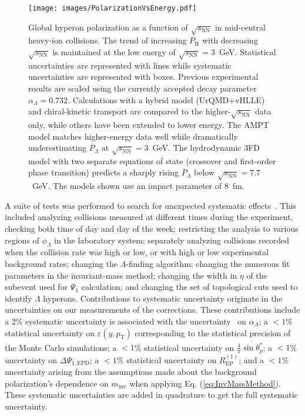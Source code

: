 \documentclass[
  reprint,
  superscriptaddress,
  amsmath,
  amssymb,
  aps,
  floatfix,
]{revtex4-2}
\newcommand{\proton}{p}
\newcommand{\sNN}{\sqrt{s_\mathrm{NN}}}
\newcommand{\REP}{R_\mathrm{EP}^{(1)}}
\newcommand{\InvMass}{m_\mathrm{inv}}
\newcommand{\pstar}{_\proton^{*}}
\newcommand{\PsiEP}{\Psi_{1}}
\newcommand{\PsiEpd}{\Psi_{1, \mathrm{EPD}}}
\newcommand{\PLambda}{\overline{P}_{\Lambda}}
\newcommand{\PHyper}{\overline{P}_\mathrm{H}}
\newcommand{\Efficiency}{\varepsilon\left(y,p_\mathrm{T}\right)}
\newcommand{\AZero}{\tfrac{4}{\pi}\overline{\sin\theta\pstar}}
\begin{document}
\begin{figure}[t]
  \centering
  \texttt{[image: images/PolarizationVsEnergy.pdf]}
  \caption{Global hyperon polarization as a
 function of $\sNN$ in mid-central heavy-ion
 collisions. The trend of increasing $\PHyper$
 with decreasing $\sNN$ is maintained at
 the low energy of $\sNN=3$~GeV.
 Statistical uncertainties are represented with lines
 while systematic uncertainties are represented with
 boxes. Previous experimental results\cite{Abelev:2007zk,STAR:2017ckg,Adam:2018ivw,Acharya:2019ryw} are scaled\cite{Becattini:2020ngo}
 using the currently accepted\cite{Zyla:2020zbs} decay parameter $\alpha_\Lambda=0.732$.
 Calculations with a hybrid model (UrQMD+vHLLE)\cite{Karpenko:2016jyx}
 and chiral-kinetic transport\cite{Sun:2017xhx} are compared to
 the higher-$\sNN$ data only, while others
 have been extended to lower energy.
 The AMPT model\cite{guo2021locating} matches higher-energy data
 well while dramatically underestimating $\PLambda$ at
 $\sNN=3$~GeV. The hydrodynamic 3FD model\cite{Ivanov:2020udj} with
 two separate equations of state (crossover
 and first-order phase transition) predicts a
 sharply rising $\PLambda$ below $\sNN=7.7$~GeV.
 The models shown use an impact parameter of 8~fm. }
  \label{fig:PolarVsEnergy}
\end{figure}

A suite of tests was performed
 to search for unexpected systematic effects~\cite{Barlow:2002yb}.
 This included analyzing collisions measured at
 different times during the experiment, checking
 both time of day and day
 of the week; restricting the analysis
 to various regions of $\phi_\Lambda$ in the laboratory system;
  separately analyzing collisions recorded when the collision rate was high or low,
  or with high or low
 experimental background rates; changing the $\Lambda$-finding
 algorithm; changing the numerous fit parameters
 in the invariant-mass method; changing the
 width in $\eta$ of the subevent
 used for $\PsiEP$ calculation; and changing
 the set of topological cuts used to identify $\Lambda$ hyperons. 
Contributions to systematic uncertainty originate in
 the uncertainties on our measurements of
 the corrections.
 These contributions include a 2\% systematic uncertainty
  is associated with the uncertainty~\cite{Zyla:2020zbs} on
  $\alpha_\Lambda$; a $<1$\% statistical uncertainty on
  $\Efficiency$ corresponding to the statistical precision
  of the Monte Carlo simulations; a
  $<1$\% statistical uncertainty on $\AZero$;
  a $<1$\% uncertainty on $\Delta\PsiEpd$; a
  $<1$\% statistical uncertainty on $\REP$; and
  a $<1$\% uncertainty arising from the
  assumptions made about the background polarization's
  dependence on $\InvMass$ when applying Eq. (\ref{eq:InvMassMethod}).
 These systematic
 uncertainties are added in quadrature to
 get the full systematic uncertainty.
\end{document}
